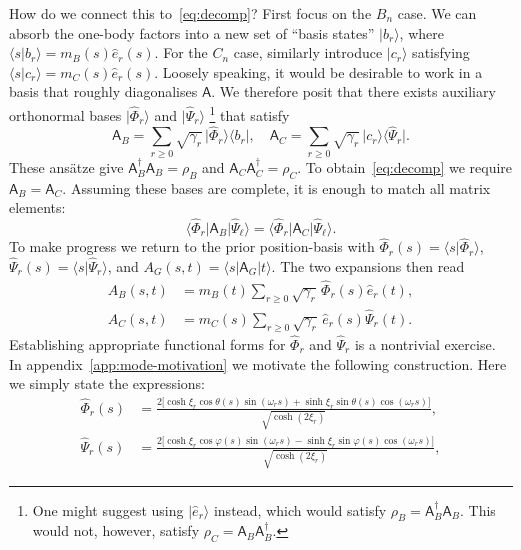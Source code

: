 How do we connect this to~\eqref{eq:decomp}? First focus on the $B_n$ case. We
can absorb the one-body factors into a new set of ``basis states'' $\lvert
b_r\rangle$, where $\langle s|b_r\rangle=m_B(s)\hat{e}_r(s)$.
For the $C_n$ case, similarly introduce $\lvert c_r\rangle$ satisfying
$\langle s|c_r\rangle=m_C(s)\hat{e}_r(s)$. Loosely speaking, it would be
desirable to work in a basis that roughly diagonalises $\mathsf A$.
We therefore posit that there exists auxiliary orthonormal bases
$\lvert\hat{\Phi}_r\rangle$ and $\lvert\hat{\Psi}_r\rangle$
\footnote{One might suggest using $\lvert \hat{e}_r\rangle$ instead, which
  would satisfy $\rho_B=\mathsf A_B^\dagger \mathsf A_B$. This would not,
  however, satisfy $\rho_C=\mathsf A_B \mathsf A_B^\dagger$.}
that satisfy
\begin{equation}
  \mathsf A_B=\sum_{r\geq0}\sqrt{\gamma_r}\,
  \lvert\hat{\Phi}_r\rangle\langle b_r\rvert, \quad
  \mathsf A_C=\sum_{r\geq0}\sqrt{\gamma_r}\,
  \lvert c_r\rangle\langle\hat{\Psi}_r\rvert.
\end{equation}
These ans\"atze give $\mathsf A_B^\dagger\mathsf A_B=\rho_B$ and $\mathsf
  A_C\mathsf A_C^\dagger=\rho_C$. To obtain~\eqref{eq:decomp} we require
$\mathsf A_B=\mathsf A_C$. Assuming these bases are complete, it is enough to
match all matrix elements:
\begin{equation}
  \langle\hat{\Phi}_r|\mathsf A_B|\hat{\Psi}_\ell\rangle
  =\langle\hat{\Phi}_r|\mathsf A_C|\hat{\Psi}_\ell\rangle.
  \label{eq:matrix-elements}
\end{equation}
To make progress we return to the prior position-basis with
$\hat{\Phi}_r(s)=\langle s|\hat{\Phi}_r\rangle$,
$\hat{\Psi}_r(s)=\langle s|\hat{\Psi}_r\rangle$, and
$A_G(s,t)=\langle s|\mathsf A_G|t\rangle$. The two expansions then read
\begin{equation}
  \begin{aligned}
    A_B(s,t)&=m_B(t)\sum_{r\geq0}\sqrt{\gamma_r}\,
    \hat{\Phi}_r(s)\hat{e}_r(t),\\
    A_C(s,t)&=m_C(s)\sum_{r\geq0}\sqrt{\gamma_r}\,
    \hat{e}_r(s)\hat{\Psi}_r(t).
  \end{aligned}
  \label{eq:darboux-series}
\end{equation}
Establishing appropriate functional forms for $\hat{\Phi}_r$ and
$\hat{\Psi}_r$ is a nontrivial exercise.
In appendix~\ref{app:mode-motivation} we motivate the following construction.
Here we simply state the expressions:
\begin{equation}
  \begin{aligned}
    \hat{\Phi}_r(s)&=\frac{2\bigl[\cosh\xi_r\cos\theta(s)\sin(\omega_rs)
        +\sinh\xi_r\sin\theta(s)\cos(\omega_rs)\bigr]}
    {\sqrt{\cosh(2\xi_r)}},\\
    \hat{\Psi}_r(s)&=\frac{2\bigl[\cosh\xi_r\cos\varphi(s)\sin(\omega_rs)
        -\sinh\xi_r\sin\varphi(s)\cos(\omega_rs)\bigr]}
    {\sqrt{\cosh(2\xi_r)}},
  \end{aligned}
  \label{eq:outgoing}
\end{equation}
